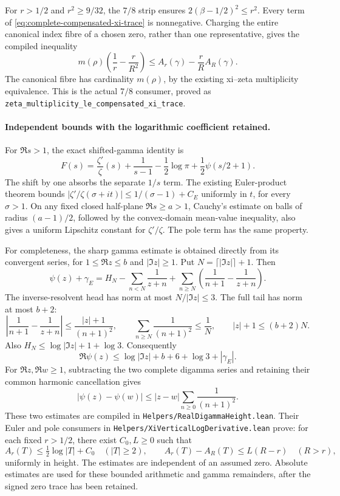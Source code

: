 For \(r>1/2\) and \(r^2\ge9/32\), the \(7/8\) strip ensures
\(2(\beta-1/2)^2\le r^2\). Every term of
\eqref{eq:complete-compensated-xi-trace} is nonnegative.
Charging the entire canonical index fibre of a chosen zero, rather
than one representative, gives the compiled inequality
\begin{equation}\label{eq:qrh-compensated-multiplicity}
 m(\rho)\left(\frac1r-\frac r{R^2}\right)
 \le A_r(\gamma)-\frac rR A_R(\gamma).
\end{equation}
The canonical fibre has cardinality \(m(\rho)\), by the existing
xi--zeta multiplicity equivalence. This is the actual \(7/8\)
consumer, proved as
\texttt{zeta\_multiplicity\_le\_compensated\_xi\_trace}.

\paragraph{Independent bounds with the logarithmic coefficient retained.}
For \(\Re s>1\), the exact shifted-gamma identity is
\[
 F(s)=\frac{\zeta'}{\zeta}(s)+\frac1{s-1}
       -\frac12\log\pi+\frac12\psi(s/2+1).
\]
The shift by one absorbs the separate \(1/s\) term.
The existing Euler-product theorem bounds
\(|\zeta'/\zeta(\sigma+it)|\le1/(\sigma-1)+C_E\)
uniformly in \(t\), for every \(\sigma>1\).
On any fixed closed half-plane \(\Re s\ge a>1\), Cauchy's estimate
on balls of radius \((a-1)/2\), followed by the convex-domain
mean-value inequality, also gives a uniform Lipschitz constant for
\(\zeta'/\zeta\). The pole term has the same property.

For completeness, the sharp gamma estimate is obtained directly
from its convergent series, for \(1\le\Re z\le b\) and
\(|\Im z|\ge1\). Put \(N=\lceil|\Im z|\rceil+1\). Then
\[
 \psi(z)+\gamma_E
 =H_N-\sum_{n<N}\frac1{z+n}
   +\sum_{n\ge N}\left(\frac1{n+1}-\frac1{z+n}\right).
\]
The inverse-resolvent head has norm at most
\(N/|\Im z|\le3\). The full tail has norm at most \(b+2\):
\[
 \left|\frac1{n+1}-\frac1{z+n}\right|
 \le\frac{|z|+1}{(n+1)^2},\qquad
 \sum_{n\ge N}\frac1{(n+1)^2}\le\frac1N,\qquad
 |z|+1\le(b+2)N.
\]
Also \(H_N\le\log|\Im z|+1+\log3\). Consequently
\[
 \Re\psi(z)\le\log|\Im z|
       +b+6+\log3+|\gamma_E|.
\]
For \(\Re z,\Re w\ge1\), subtracting the two complete digamma series
and retaining their common harmonic cancellation gives
\[
 |\psi(z)-\psi(w)|
 \le |z-w|\sum_{n\ge0}\frac1{(n+1)^2}.
\]
These two estimates are compiled in
\texttt{Helpers/RealDigammaHeight.lean}. Their Euler and pole
consumers in \texttt{Helpers/XiVerticalLogDerivative.lean} prove:
for each fixed \(r>1/2\), there exist \(C_0,L\ge0\) such that
\[
 A_r(T)\le\tfrac12\log|T|+C_0\quad(|T|\ge2),\qquad
 A_r(T)-A_R(T)\le L(R-r)\quad(R>r),
\]
uniformly in height. The estimates are independent of an assumed
zero. Absolute estimates are used for these bounded arithmetic and
gamma remainders, after the signed zero trace has been retained.

